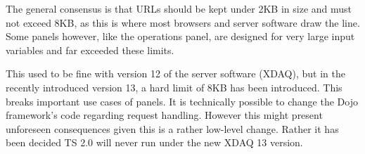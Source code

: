The general consensus is that URLs should be kept under 2KB in size and must not
exceed 8KB, as this is where most browsers and server software draw the line.
Some panels however, like the operations panel, are
designed for very large input variables and far exceeded these limits.

This used to be fine with version 12 of the server software (XDAQ), but in the
recently introduced version 13, a hard limit of 8KB has been introduced.
This breaks important use cases of panels. It is technically possible to change
the Dojo framework's code regarding request handling. However this might
present unforeseen consequences given this is a rather low-level change. Rather
it has been decided TS 2.0 will never run under the new XDAQ 13 version.
